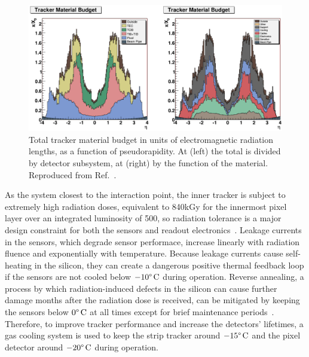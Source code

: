 \begin{figure}[htbp]
  \centering
  \includegraphics[width=\textwidth]{experiment/trackerMaterial.png}
  \caption[Tracker material budget in radiation lengths]{
    Total tracker material budget in units of electromagnetic radiation lengths, as a function of pseudorapidity.
    At (left) the total is divided by detector subsystem, at (right) by the function of the material. Reproduced from Ref.~\cite{Chatrchyan:2008zzk}.
  }\label{fig:trackerMaterial}
\end{figure}

As the system closest to the interaction point, the inner tracker is subject to extremely high radiation doses, equivalent to 840\unit{kGy} for the innermost pixel layer over an integrated luminosity of 500\fbinv, so radiation tolerance is a major design constraint for both the sensors and readout electronics~\cite{Karimaki:368412}.
Leakage currents in the sensors, which degrade sensor performace, increase linearly with radiation fluence and exponentially with temperature.
Because leakage currents cause self-heating in the silicon, they can create a dangerous positive thermal feedback loop if the sensors are not cooled below $-10\degree\mathrm{\,C}$ during operation.
Reverse annealing, a process by which radiation-induced defects in the silicon can cause further damage months after the radiation dose is received, can be mitigated by keeping the sensors below $0\degree\mathrm{\,C}$ at all times except for brief maintenance periods~\cite{Chatrchyan:2008zzk}.
Therefore, to improve tracker performance and increase the detectors' lifetimes, a gas cooling system is used to keep the strip tracker around $-15\degree\mathrm{\,C}$ and the pixel detector around $-20\degree\mathrm{\,C}$ during operation.


